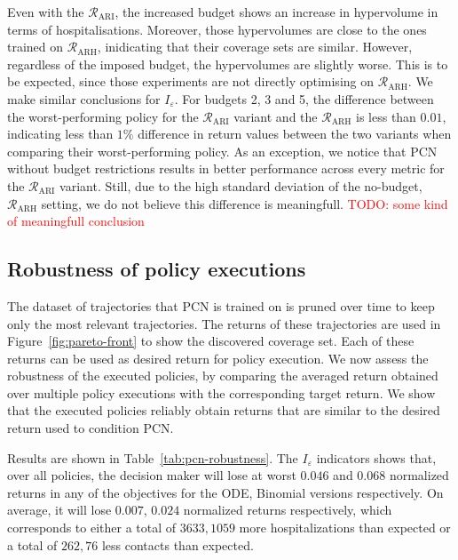 \documentclass{article}
\newcommand\todo[1]{\textcolor{red}{TODO: #1}}
\newcommand{\mdprewardfn}{\mathcal{R}}
\begin{document}
Even with the $\mdprewardfn_\text{ARI}$, the increased budget shows an increase in hypervolume in terms of hospitalisations. Moreover, those hypervolumes are close to the ones trained on $\mdprewardfn_\text{ARH}$, inidicating that their coverage sets are similar. However, regardless of the imposed budget, the hypervolumes are slightly worse. This is to be expected, since those experiments are not directly optimising on $\mdprewardfn_\text{ARH}$. We make similar conclusions for $I_\varepsilon$. For budgets 2, 3 and 5, the difference between the worst-performing policy for the $\mdprewardfn_\text{ARI}$ variant and the $\mdprewardfn_\text{ARH}$ is less than $0.01$, indicating less than $1\%$ difference in return values between the two variants when comparing their worst-performing policy. As an exception, we notice that PCN without budget restrictions results in better performance across every metric for the $\mdprewardfn_\text{ARI}$ variant. Still, due to the high standard deviation of the no-budget, $\mdprewardfn_\text{ARH}$ setting, we do not believe this difference is meaningfull. \todo{some kind of meaningfull conclusion}

\subsection{Robustness of policy executions}
\label{sec:pcn-robustness}

The dataset of trajectories that PCN is trained on is pruned over time to keep only the most relevant trajectories. The returns of these trajectories are used in Figure~\ref{fig:pareto-front} to show the discovered coverage set. Each of these returns can be used as desired return for policy execution. We now assess the robustness of the executed policies, by comparing the averaged return obtained over multiple policy executions with the corresponding target return. We show that the executed policies reliably obtain returns that are similar to the desired return used to condition PCN.

Results are shown in Table~\ref{tab:pcn-robustness}. The $I_\varepsilon$ indicators shows that, over all policies, the decision maker will lose at worst $0.046$ and $0.068$ normalized returns in any of the objectives for the ODE, Binomial versions respectively. On average, it will lose $0.007$, $0.024$ normalized returns respectively, which corresponds to either a total of $3633, 1059$ more hospitalizations than expected or a total of $262, 76$ less contacts than expected.
\end{document}
